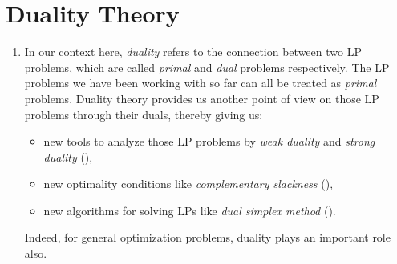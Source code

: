 \section{Duality Theory}
\label{sect:duality}
\begin{enumerate}
\item In our context here, \emph{duality} refers to the connection between two
LP problems, which are called \emph{primal} and \emph{dual} problems
respectively. The LP problems we have been working with so far can all be
treated as \emph{primal} problems. Duality theory provides us another point of
view on those LP problems through their duals, thereby giving us:
\begin{itemize}
\item new tools to analyze those LP problems by \emph{weak duality} and
\emph{strong duality} (),
\item new optimality conditions like \emph{complementary slackness} (),
\item new algorithms for solving LPs like \emph{dual simplex method} ().
\end{itemize}
Indeed, for general optimization problems, duality plays an important role
also.
\end{enumerate}
